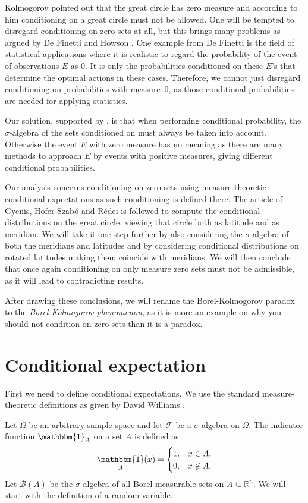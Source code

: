 \documentclass[a4paper]{report}
\theoremstyle{plain}
\theoremstyle{definition}
\theoremstyle{remark}
\numberwithin{equation}{chapter}
\newcommand{\R}{\mathbb{R}}
\DeclareMathOperator{\1}{\mathbbm{1}}
\newcommand{\B}{\mathcal{B}}
\begin{document}
Kolmogorov \cite{Kolmogorov33} pointed out that the great circle has zero measure and according to him conditioning on a great circle must not be allowed. One will be tempted to disregard conditioning on zero sets at all, but this brings many problems as argued by De Finetti \cite{Finetti72} and Howson \cite{Howson14}. One example from De Finetti is the field of statistical applications where it is realistic to regard the probability of the event of observations $E$ as $0$. It is only the probabilities conditioned on these $E$'s that determine the optimal actions in these cases. Therefore, we cannot just disregard conditioning on probabilities with measure~$0$, as those conditional probabilities are needed for applying statistics.

Our solution, supported by \cite{Rao88,Billingsley95,Proschan98,Easwaran08,Myrvold15,Gyenis17}, is that when performing conditional probability, the $\sigma$-algebra of the sets conditioned on must always be taken into account. Otherwise the event $E$ with zero measure has no meaning as there are many methods to approach $E$ by events with positive measures, giving different conditional probabilities. 

Our analysis concerns conditioning on zero sets using measure-theoretic conditional expectations as such conditioning is defined there. The article of Gyenis, Hofer-Szabó and Rédei \cite{Gyenis17} is followed to compute the conditional distributions on the great circle, viewing that circle both as latitude and as meridian. We will take it one step further by also considering the $\sigma$-algebra of both the meridians and latitudes and by considering conditional distributions on rotated latitudes making them coincide with meridians. We will then conclude that once again conditioning on only measure zero sets must not be admissible, as it will lead to contradicting results.

After drawing these conclusions, we will rename the Borel-Kolmogorov paradox to the \emph{Borel-Kolmogorov phenomenon}, as it is more an example on why you should not condition on zero sets than it is a paradox.

\section{Conditional expectation}
First we need to define conditional expectations. We use the standard measure-theoretic definitions as given by David Williams \cite{Williams91}.

Let $\Omega$ be an arbitrary sample space and let $\mathcal{F}$ be a $\sigma$-algebra on $\Omega$. The indicator function $\1_A$ on a set $A$ is defined as
\begin{equation}
\1_A(x)=\begin{cases}1,&x\in A,\\0,&x\not\in A.\end{cases}
\end{equation}
Let $\B(A)$ be the $\sigma$-algebra of all Borel-measurable sets on $A\subseteq\R^n$. We will start with the definition of a random variable.
\end{document}
